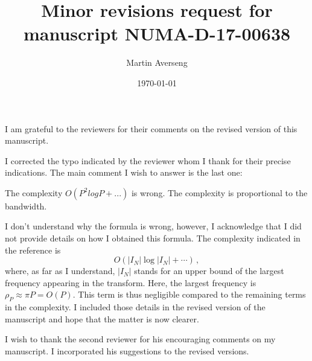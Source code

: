 \documentclass[10pt]{article}
\title{Minor revisions request for manuscript
		NUMA-D-17-00638 \\}
\author{Martin Averseng}
\date{\today}
\begin{document}
	
	I am grateful to the reviewers for their comments on the revised version of this manuscript. 
	
	
	I corrected the typo indicated by the reviewer whom I thank for their precise indications. The main comment I wish to answer is the last one:
	\begin{response}
		{The complexity $O(P ^2 log P+ ...)$ is wrong. The complexity is proportional to the bandwidth.}
	\end{response}	
	I don't understand why the formula is wrong, however, I acknowledge  that I did not provide details on how I obtained this formula. The complexity indicated in the reference is 
	\[O( |I_N| \log |I_N| + \cdots)\,,\]
	where, as far as I understand,  $|I_N|$  stands for an upper bound of the largest frequency appearing in the transform. Here, the largest frequency is $\rho_P \approx \pi P = O(P).$ This term is thus negligible compared to the remaining terms in the complexity. I included those details in the revised version of the manuscript and hope that the matter is now clearer. 
	
	
	I wish to thank the second reviewer for his encouraging comments on my manuscript. I incorporated his suggestions to the revised versions.
	
	
	
	
	 
	
	  
	
\end{document}
